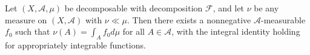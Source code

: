 Let $(X, \mathcal{A}, \mu)$ be decomposable with decomposition $\mathcal{F}$, and let $\nu$ be any measure on $(X, \mathcal{A})$ with $\nu \ll \mu$. Then there exists a nonnegative $\mathcal{A}$-measurable $f_0$ such that $\nu(A) = \int_A f_0 d\mu$ for all $A \in \mathcal{A}$, with the integral identity holding for appropriately integrable functions.
